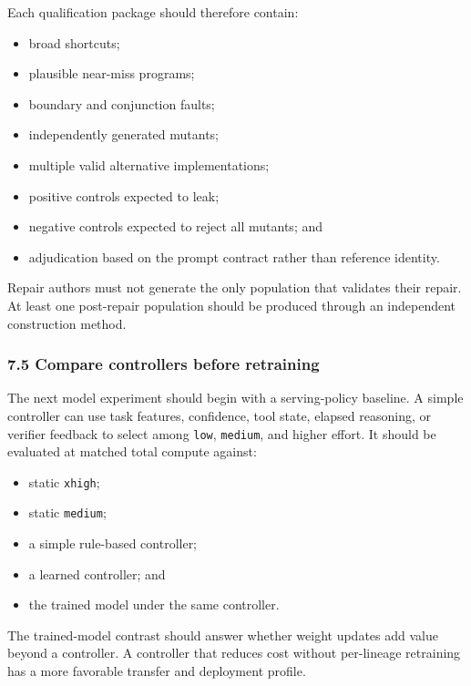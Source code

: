\documentclass[
]{article}
\providecommand{\tightlist}{%
  \setlength{\itemsep}{0pt}\setlength{\parskip}{0pt}}
\begin{document}
Each qualification package should therefore contain:

\begin{itemize}
\tightlist
\item
  broad shortcuts;
\item
  plausible near-miss programs;
\item
  boundary and conjunction faults;
\item
  independently generated mutants;
\item
  multiple valid alternative implementations;
\item
  positive controls expected to leak;
\item
  negative controls expected to reject all mutants; and
\item
  adjudication based on the prompt contract rather than reference
  identity.
\end{itemize}

Repair authors must not generate the only population that validates
their repair. At least one post-repair population should be produced
through an independent construction method.

\subsubsection{7.5 Compare controllers before
retraining}\label{75-compare-controllers-before-retraining}

The next model experiment should begin with a serving-policy baseline. A
simple controller can use task features, confidence, tool state, elapsed
reasoning, or verifier feedback to select among \texttt{low},
\texttt{medium}, and higher effort. It should be evaluated at matched
total compute against:

\begin{itemize}
\tightlist
\item
  static \texttt{xhigh};
\item
  static \texttt{medium};
\item
  a simple rule-based controller;
\item
  a learned controller; and
\item
  the trained model under the same controller.
\end{itemize}

The trained-model contrast should answer whether weight updates add
value beyond a controller. A controller that reduces cost without
per-lineage retraining has a more favorable transfer and deployment
profile.
\end{document}
